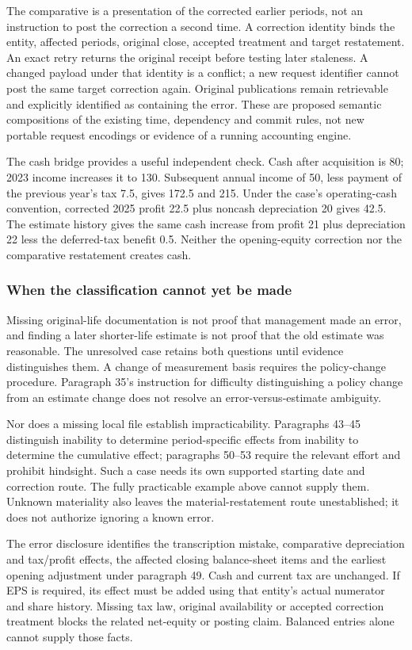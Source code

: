 The comparative is a presentation of the corrected earlier periods, not
an instruction to post the correction a second time. A correction identity
binds the entity, affected periods, original close, accepted treatment and
target restatement. An exact retry returns the original receipt before
testing later staleness. A changed payload under that identity is a
conflict; a new request identifier cannot post the same target correction
again. Original publications remain retrievable and explicitly identified
as containing the error. These are proposed semantic compositions of the
existing time, dependency and commit rules, not new portable request
encodings or evidence of a running accounting engine.

The cash bridge provides a useful independent check. Cash after acquisition
is 80; 2023 income increases it to 130. Subsequent annual income of 50,
less payment of the previous year's tax 7.5, gives 172.5 and 215. Under
the case's operating-cash convention, corrected 2025 profit 22.5 plus
noncash depreciation 20 gives 42.5. The estimate history gives the same
cash increase from profit 21 plus depreciation 22 less the deferred-tax
benefit 0.5. Neither the opening-equity correction nor the comparative
restatement creates cash.

\subsubsection{When the classification cannot yet be made}

Missing original-life documentation is not proof that management made an
error, and finding a later shorter-life estimate is not proof that the
old estimate was reasonable. The unresolved case retains both questions
until evidence distinguishes them. A change of measurement basis requires
the policy-change procedure. Paragraph 35's instruction for difficulty
distinguishing a policy change from an estimate change does not resolve
an error-versus-estimate ambiguity.

Nor does a missing local file establish impracticability. Paragraphs 43--45
distinguish inability to determine period-specific effects from inability
to determine the cumulative effect; paragraphs 50--53 require the relevant
effort and prohibit hindsight. Such a case needs its own supported starting
date and correction route. The fully practicable example above cannot
supply them. Unknown materiality also leaves the material-restatement
route unestablished; it does not authorize ignoring a known error.

The error disclosure identifies the transcription mistake, comparative
depreciation and tax/profit effects, the affected closing balance-sheet
items and the earliest opening adjustment under paragraph 49. Cash and
current tax are unchanged. If EPS is required, its effect must be added
using that entity's actual numerator and share history. Missing tax law,
original availability or accepted correction treatment blocks the related
net-equity or posting claim. Balanced entries alone cannot supply those facts.
